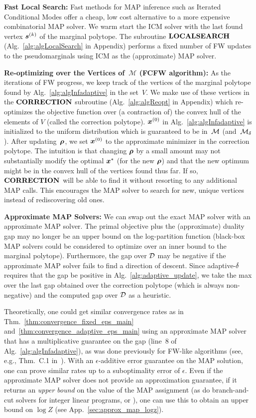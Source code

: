 %
%

\textbf{Fast Local Search: }
Fast methods for MAP inference such as Iterated Conditional Modes \citep{besag1986statistical} offer a cheap,
low cost alternative to a more expensive combinatorial MAP solver. We warm start the ICM solver
with the last found vertex $\bm{s}^{(k)}$ of the marginal polytope.
The subroutine $\textbf{\textrm{LOCALSEARCH}}$ (Alg.~\ref{alg:algLocalSearch} in Appendix) performs
a fixed number of FW updates to the pseudomarginals using ICM as the (approximate) MAP solver.  

\textbf{Re-optimizing over the Vertices of~$\mathcal{M}$ (FCFW algorithm): }
As the iterations of FW progress, we keep track of the vertices of the marginal polytope 
found by Alg.~\ref{alg:algInfadaptive} in the set~$V$.
We make use of these vertices in the $\textbf{\textrm{CORRECTION}}$ subroutine
(Alg.~\ref{alg:algReopt} in Appendix)
which re-optimizes the objective function over (a contraction of) the convex hull of the elements of $V$ (called the correction polytope).
%
%
$\bm{x}^{(0)}$ in Alg.~\ref{alg:algInfadaptive} is initialized to the uniform distribution
which is guaranteed to be in~$\mathcal{M}$ (and~$\mathcal{M}_{\delta}$). After updating~$\bm{\rho}$, 
%
we set $\bm{x}^{(0)}$ to the approximate minimizer in 
the correction polytope.
%
%
The intuition is that changing $\bm{\rho}$ by a small amount
may not substantially modify the optimal $\bm{x}^*$ (for the new $\bm{\rho}$) and that the new optimum might 
be in the convex hull of the
vertices found thus far. 
If so, $\textbf{\textrm{CORRECTION}}$ will be able to find it without
resorting to any additional MAP calls. 
This encourages the MAP solver to search 
for new, unique vertices instead of rediscovering old ones. 

\textbf{Approximate MAP Solvers: }
We can swap out the exact MAP solver with an approximate MAP solver. 
%
The primal objective plus the (approximate) duality gap may no longer be an upper bound 
on the log-partition function (black-box MAP solvers could be
considered to optimize over an inner bound to the marginal polytope).
%
%
%
%
%
Furthermore, the gap over $\mathcal{D}$ may be negative
if the approximate MAP solver fails to find a direction of descent. Since adaptive-$\delta$ requires 
that the gap be positive in Alg.~\ref{alg:adaptive_update},
we take the max over the last gap obtained over the correction
polytope (which is always non-negative) and the computed gap over $\mathcal{D}$ as a heuristic. 

Theoretically, one could get similar convergence rates 
as in Thm.~\ref{thm:convergence_fixed_eps_main}
and~\ref{thm:convergence_adaptive_eps_main} using an approximate
MAP solver that has a multiplicative guarantee on the gap (line~8 of Alg.~\ref{alg:algInfadaptive}),
as was done previously for FW-like algorithms (see, e.g., Thm.~C.1 in~\citet{lacoste2012block}).
With an $\epsilon$-additive error guarantee on the MAP solution, one can prove 
similar rates up to a suboptimality error of $\epsilon$.
Even if the approximate MAP solver does not provide an approximation
guarantee, if it returns an  {\em upper bound} on the value of the MAP
assignment (as do branch-and-cut solvers for integer linear programs,
or \cite{SontagEtAl_uai08}),
one can use this to obtain an upper bound on $\log Z$ (see App.~\ref{sec:approx_map_logz}).

%
%
%
%
%
%
